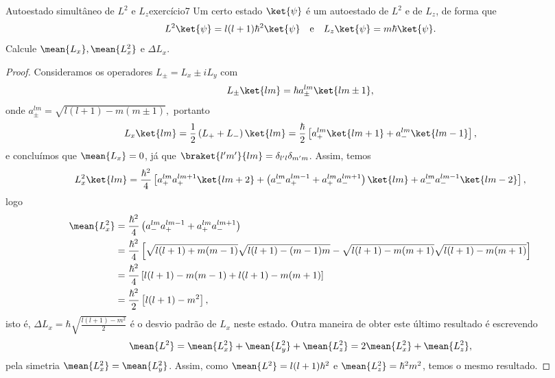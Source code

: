 \begin{exercício}{Autoestado simultâneo de \(L^2\) e \(L_z\)}{exercício7}
    Um certo estado \(\ket{\psi}\) é um autoestado de \(L^2\) e de \(L_z\), de forma que
    \begin{equation*}
        L^2\ket{\psi} = l(l+1)\hbar^2 \ket{\psi}\quad\text{e}\quad L_z\ket{\psi} = m\hbar \ket{\psi}.
    \end{equation*}
    Calcule \(\mean{L_x}, \mean{L_x^2}\) e \(\Delta L_x\).
\end{exercício}
\begin{proof}
    Consideramos os operadores \(L_\pm = L_x \pm i L_y\) com
    \begin{equation*}
        L_\pm \ket{lm} = \hbar a_\pm^{lm}\ket{l m\pm1},
    \end{equation*}
    onde \(a_\pm^{lm} = \sqrt{l(l+1) - m(m\pm1)},\)
    portanto
    \begin{equation*}
        L_x\ket{lm} = \frac12 \left(L_+ + L_-\right)\ket{lm} = \frac{\hbar}{2}\left[a_+^{lm}\ket{lm + 1} + a_-^{lm}\ket{lm -1}\right],
    \end{equation*}
    e concluímos que \(\mean{L_x} = 0\), já que \(\braket{l'm'}{lm} = \delta_{l'l}\delta_{m'm}\). Assim, temos
    \begin{equation*}
        L_x^2 \ket{lm} = \frac{\hbar^2}{4}\left[a_+^{lm}a_+^{lm+1}\ket{l m+2} + \left(a_-^{lm}a_+^{lm-1}+a_+^{lm}a_-^{lm+1}\right)\ket{lm} + a_-^{lm}a_-^{lm-1}\ket{lm-2}\right],
    \end{equation*}
    logo
    \begin{align*}
        \mean{L_x^2} &= \frac{\hbar^2}{4}\left(a_-^{lm}a_+^{lm-1}+a_+^{lm}a_-^{lm+1}\right)\\
                     &= \frac{\hbar^2}{4}\left[\sqrt{l(l+1) + m(m-1)}\sqrt{l(l+1) - (m-1)m} - \sqrt{l(l+1) - m(m+1)}\sqrt{l(l+1) - m(m+1)}\right]\\
                     &= \frac{\hbar^2}{4}\left[l(l+1) - m(m-1) + l(l+1) - m(m+1)\right]\\
                     &= \frac{\hbar^2}{2}\left[l(l+1) - m^2\right],
    \end{align*}
    isto é, \(\Delta L_x = \hbar \sqrt{\frac{l(l+1) - m^2}{2}}\) é o desvio padrão de \(L_x\) neste estado. Outra maneira de obter este último resultado é escrevendo
    \begin{equation*}
        \mean{L^2} = \mean{L_x^2} + \mean{L_y^2} + \mean{L_z^2} = 2\mean{L_x^2} + \mean{L_z^2},
    \end{equation*}
    pela simetria \(\mean{L_x^2} = \mean{L_y^2}\). Assim, como \(\mean{L^2} = l(l + 1)\hbar^2\) e \(\mean{L_z^2} = \hbar^2 m^2\), temos o mesmo resultado.
\end{proof}
